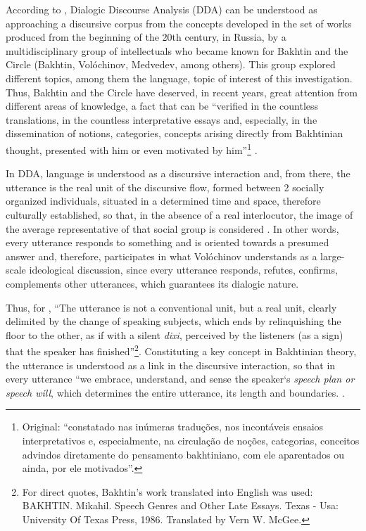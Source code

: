 \documentclass[english]{textolivre}
\begin{document}
According to \textcite{brait_bakhtin_2020}, Dialogic Discourse Analysis (DDA) can be understood as approaching a discursive corpus from the concepts developed in the set of works produced from the beginning of the 20th century, in Russia, by a multidisciplinary group of intellectuals who became known for Bakhtin and the Circle (Bakhtin, Volóchinov, Medvedev, among others). This group explored different topics, among them the language, topic of interest of this investigation. Thus, Bakhtin and the Circle have deserved, in recent years, great attention from different areas of knowledge, a fact that can be “verified in the countless translations, in the countless interpretative essays and, especially, in the dissemination of notions, categories, concepts arising directly from Bakhtinian thought, presented with him or even motivated by him”\footnote{Original: “constatado nas inúmeras traduções, nos incontáveis ensaios interpretativos e, especialmente, na circulação de noções, categorias, conceitos advindos diretamente do pensamento bakhtiniano, com ele aparentados ou ainda, por ele motivados”.} \cite[p. 8]{brait_bakhtin_2020}.

In DDA, language is understood as a discursive interaction and, from there, the utterance is the real unit of the discursive flow, formed between 2 socially organized individuals, situated in a determined time and space, therefore culturally established, so that, in the absence of a real interlocutor, the image of the average representative of that social group is considered \cite{volochinov2018}. In other words, every utterance responds to something and is oriented towards a presumed answer and, therefore, participates in what Volóchinov understands as a large-scale ideological discussion, since every utterance responds, refutes, confirms, complements other utterances, which guarantees its dialogic nature.

Thus, for \textcite[p. 71-80]{bakthin1986}, “The utterance is not a conventional unit, but a real unit, clearly delimited by the change of speaking subjects, which ends by relinquishing the floor to the other, as if with a silent \emph{dixi}, perceived by the listeners (as a sign) that the speaker has finished”\footnote{For direct quotes, Bakhtin’s work translated into English was used: BAKHTIN. Mikahil. Speech Genres and Other Late Essays. Texas - Usa: University Of Texas Press, 1986. Translated by Vern W. McGee.}. Constituting a key concept in Bakhtinian theory, the utterance is understood as a link in the discursive interaction, so that in every utterance “we embrace, understand, and sense the speaker‘s \emph{speech plan or speech will}, which determines the entire utterance, its length and boundaries. \cite[p.77, emphasis in original]{bakthin1986}.
\end{document}
